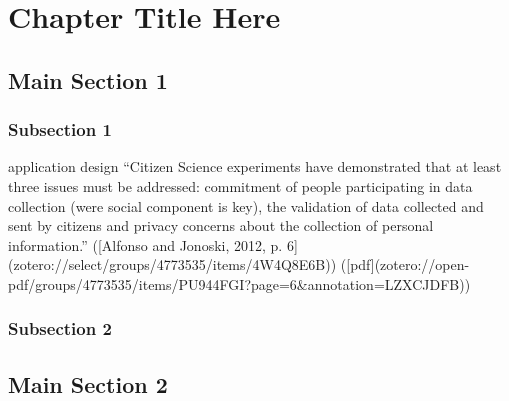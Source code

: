 
\chapter{Chapter Title Here} %

\label{ChapterX} %


\section{Main Section 1}

\subsection{Subsection 1}
application design 
“Citizen Science experiments have demonstrated that at least three issues must be addressed: commitment of people participating in data collection (were social component is key), the validation of data collected and sent by citizens and privacy concerns about the collection of personal information.” ([Alfonso and Jonoski, 2012, p. 6](zotero://select/groups/4773535/items/4W4Q8E6B)) ([pdf](zotero://open-pdf/groups/4773535/items/PU944FGI?page=6\&annotation=LZXCJDFB))

\subsection{Subsection 2}


\section{Main Section 2}
